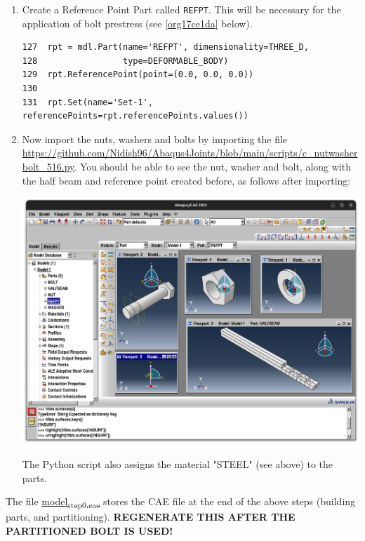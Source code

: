 \documentclass[11pt]{article}
\begin{document}
\begin{enumerate}
\item Create a Reference Point Part called \texttt{REFPT}.
This will be necessary for the application of bolt prestress (see \ref{org17ce1da} below).
\begin{verbatim}
127  rpt = mdl.Part(name='REFPT', dimensionality=THREE_D, 
128                 type=DEFORMABLE_BODY)
129  rpt.ReferencePoint(point=(0.0, 0.0, 0.0))
130  
131  rpt.Set(name='Set-1', referencePoints=rpt.referencePoints.values())
\end{verbatim}
\item Now import the nuts, washers and bolts by importing the file \url{https://github.com/Nidish96/Abaqus4Joints/blob/main/scripts/c\_nutwasherbolt\_516.py}.
You should be able to see the nut, washer and bolt, along with the half beam and reference point created before, as follows after importing:
\begin{center}
\includegraphics[width=.9\linewidth]{./figs/nwb.png}
\end{center}
The Python script also assigns the material "STEEL" (see above) to the parts.
\end{enumerate}

The file \href{https://github.com/Nidish96/Abaqus4Joints/blob/main/assets/assembly/model\_step0.cae}{model\textsubscript{step0.cae}} stores the CAE file at the end of the above steps (building parts, and partitioning).
\textbf{REGENERATE THIS AFTER THE PARTITIONED BOLT IS USED!}
\end{document}
